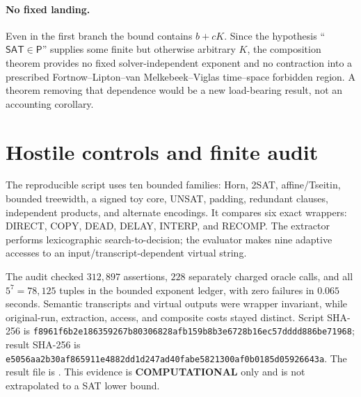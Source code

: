 \documentclass[11pt]{article}
\newcommand{\SAT}{\mathsf{SAT}}
\newcommand{\Pclass}{\mathsf{P}}
\newcommand{\COMP}{\textbf{COMPUTATIONAL}}
\begin{document}
\paragraph{No fixed landing.}
Even in the first branch the bound contains \(b+cK\).  Since the hypothesis
``\(\SAT\in\Pclass\)'' supplies some finite but otherwise arbitrary \(K\),
the composition theorem provides no fixed solver-independent exponent and no
contraction into a prescribed Fortnow--Lipton--van Melkebeek--Viglas
time--space forbidden region.  A theorem removing that dependence would be a
new load-bearing result, not an accounting corollary.

\section{Hostile controls and finite audit}
The reproducible script
 uses ten bounded
families: Horn, 2SAT, affine/Tseitin, bounded treewidth, a signed toy core,
UNSAT, padding, redundant clauses, independent products, and alternate
encodings.  It compares six exact wrappers: DIRECT, COPY, DEAD, DELAY,
INTERP, and RECOMP.  The extractor performs lexicographic search-to-decision;
the evaluator makes nine adaptive accesses to an input/transcript-dependent
virtual string.

The audit checked \(312{,}897\) assertions, \(228\) separately charged oracle
calls, and all \(5^7=78{,}125\) tuples in the bounded exponent ledger, with
zero failures in \(0.065\) seconds.  Semantic transcripts and virtual outputs
were wrapper invariant, while original-run, extraction, access, and composite
costs stayed distinct.  Script SHA-256 is
\texttt{f8961f6b2e186359267b80306828afb159b8b3e6728b16ec57dddd886be71968};
result SHA-256 is
\texttt{e5056aa2b30af865911e4882dd1d247ad40fabe5821300af0b0185d05926643a}.
The result file is
.
This evidence is \COMP{} only and is not extrapolated to a SAT lower bound.
\end{document}
